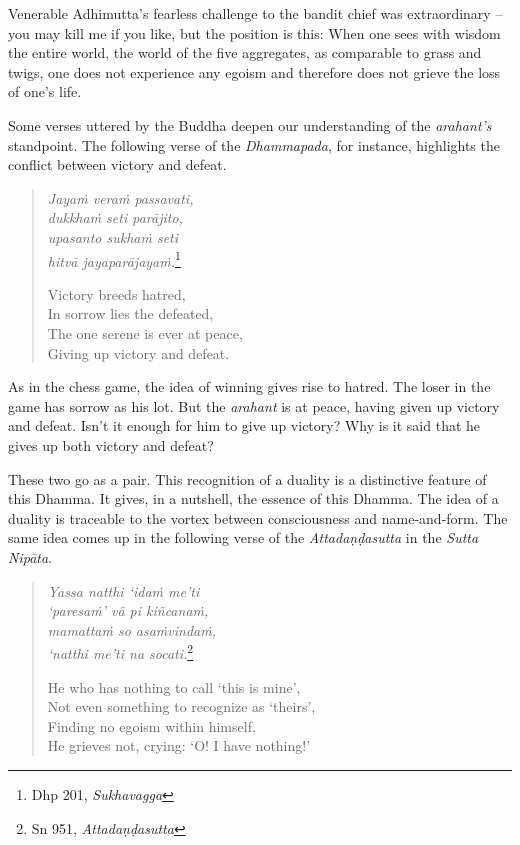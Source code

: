 Venerable Adhimutta's fearless challenge to the bandit chief was extraordinary -- you may kill me if you like, but the position is this: When one sees with wisdom the entire world, the world of the five aggregates, as comparable to grass and twigs, one does not experience any egoism and therefore does not grieve the loss of one's life.

Some verses uttered by the Buddha deepen our understanding of the \emph{arahant's} standpoint. The following verse of the \emph{Dhammapada}, for instance, highlights the conflict between victory and defeat.

\begin{quote}
\emph{Jayaṁ veraṁ passavati,}\\
\emph{dukkhaṁ seti parājito,}\\
\emph{upasanto sukhaṁ seti}\\
\emph{hitvā jayaparājayaṁ.}\footnote{Dhp 201, \emph{Sukhavagga}}

Victory breeds hatred,\\
In sorrow lies the defeated,\\
The one serene is ever at peace,\\
Giving up victory and defeat.
\end{quote}

As in the chess game, the idea of winning gives rise to hatred. The loser in the game has sorrow as his lot. But the \emph{arahant} is at peace, having given up victory and defeat. Isn't it enough for him to give up victory? Why is it said that he gives up both victory and defeat?

These two go as a pair. This recognition of a duality is a distinctive feature of this Dhamma. It gives, in a nutshell, the essence of this Dhamma. The idea of a duality is traceable to the vortex between consciousness and name-and-form. The same idea comes up in the following verse of the \emph{Attadaṇḍasutta} in the \emph{Sutta Nipāta}.

\begin{quote}
\emph{Yassa natthi `idaṁ me'ti}\\
\emph{`paresaṁ' vā pi kiñcanaṁ,}\\
\emph{mamattaṁ so asaṁvindaṁ,}\\
\emph{`natthi me'ti na socati.}\footnote{Sn 951, \emph{Attadaṇḍasutta}}

He who has nothing to call `this is mine',\\
Not even something to recognize as `theirs',\\
Finding no egoism within himself,\\
He grieves not, crying: `O! I have nothing!'
\end{quote}

